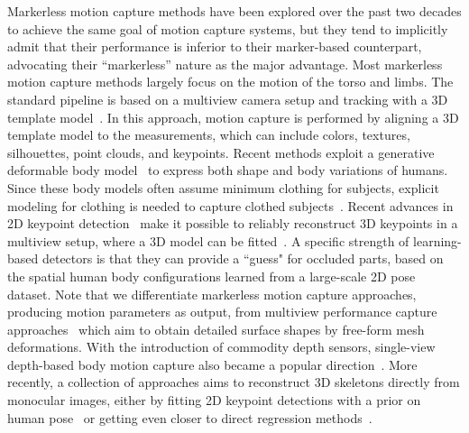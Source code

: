 Markerless motion capture methods have been explored over the past two decades to achieve the same goal of motion capture systems, but they tend to implicitly admit that their performance is inferior to their marker-based counterpart, advocating their ``markerless'' nature as the major advantage. Most markerless motion capture methods largely focus on the motion of the torso and limbs. The standard pipeline is based on a multiview camera setup and tracking with a 3D template model~\cite{Liu-2013, Gavrila-96, Cheung-05, Bregler-04, Kehl-06, Corazza-10, Vlasic-08, Brox-10, Stoll-11, deAguiar-2008, Elhayek-15}. In this approach, motion capture is performed by aligning a 3D template model to the measurements, which can include colors, textures, silhouettes, point clouds, and keypoints. Recent methods exploit a generative deformable body model~\cite{anguelov2005scape, Loper2015, pons2015dyna} to express both shape and body variations of humans. Since these body models often assume minimum clothing for subjects, explicit modeling for clothing is needed to capture clothed subjects~\cite{zhang2017detailed, pons2017clothcap}. Recent advances in 2D keypoint detection~\cite{ Newell-16, cao2017realtime, Wei2016} make it possible to reliably reconstruct 3D keypoints in a multiview setup, where a 3D model can be fitted~\cite{Elhayek-15, Joo-15, joo2017panoptic}. A specific strength of learning-based detectors is that they can provide a ``guess"  for occluded parts, based on the spatial human body configurations learned from a large-scale 2D pose dataset. Note that we differentiate markerless motion capture approaches, producing motion parameters as output, from multiview performance capture approaches~\cite{Vlasic-2009, Furukawa-2008} which aim to obtain detailed surface shapes by free-form mesh deformations. With the introduction of commodity depth sensors, single-view depth-based body motion capture also became a popular direction~\cite{Baak-13, Shotton2011}. More recently, a collection of approaches aims to reconstruct 3D skeletons directly from monocular images, either by fitting 2D keypoint detections with a prior on human pose~\cite{Zhou2015,Bogo2016} or getting even closer to direct regression methods~\cite{Zhou2016,Mehta2017,tome2017lifting}.

